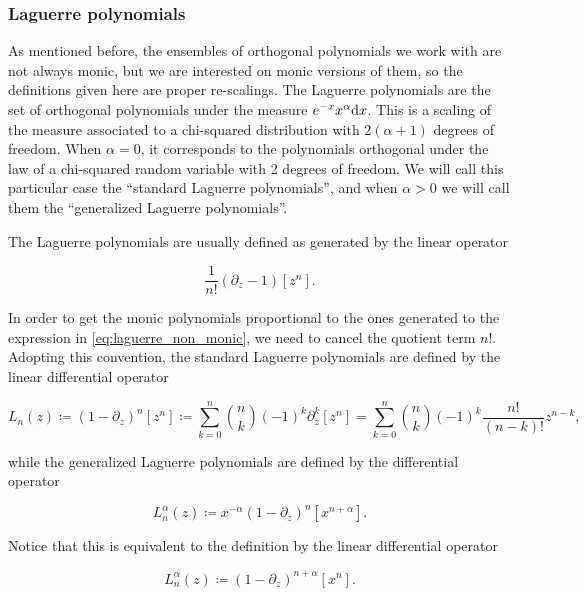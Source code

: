 \subsubsection{Laguerre polynomials}

    As mentioned before, the ensembles of orthogonal polynomials we work with are not always monic, but we are interested on monic versions of them, so the definitions given here are proper re-scalings. The Laguerre polynomials are the set of orthogonal polynomials under the measure $e^{-x}x^{\alpha}\mathrm d x$. This is a scaling of the measure associated to a chi-squared distribution with $2(\alpha + 1)$ degrees of freedom. When $\alpha=0$, it corresponds to the polynomials orthogonal under the law of a chi-squared random variable with 2 degrees of freedom. We will call this particular case the ``standard Laguerre polynomials'', and when $\alpha >0$ we will call them the ``generalized Laguerre polynomials''.

    The Laguerre polynomials are usually defined as generated by the linear operator

    \begin{equation} \label{eq:laguerre_non_monic}
        \frac1{n!}\left(\partial_z - 1\right)[z^n].
    \end{equation}

   In order to get the monic polynomials proportional to the ones generated to the expression in \eqref{eq:laguerre_non_monic}, we need to cancel the quotient term $n!$. Adopting this convention, the standard Laguerre polynomials are defined by the linear differential operator 

    \begin{equation*}
        L_n(z) \coloneqq (1 - \partial_z)^n [z^n] \coloneqq \sum_{k=0}^n \binom{n}{k} (-1)^k\partial_z^k[z^n] = \sum_{k=0}^n \binom{n}{k} (-1)^k \frac{n!}{(n-k)!} z^{n-k},
    \end{equation*}

    \noindent while the generalized Laguerre polynomials are defined by the differential operator

    \begin{equation*}
        L_n^{\alpha}(z) \coloneqq x^{-\alpha} \left( 1 - \partial_z \right)^{n}[x^{n+\alpha}].
    \end{equation*}

    Notice that this is equivalent to the definition by the linear differential operator

    \begin{equation*}
        L_n^{\alpha}(z) \coloneqq \left( 1 - \partial_z \right)^{n+\alpha}[x^n].
    \end{equation*} 


